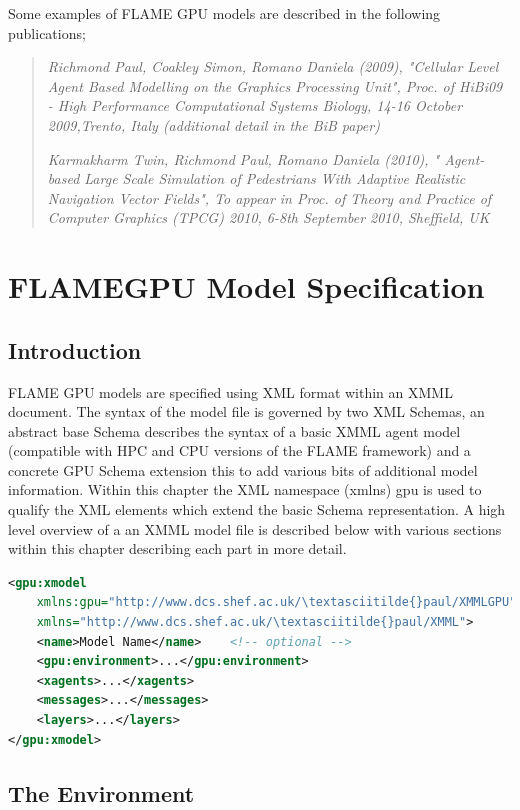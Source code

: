 \documentclass[11pt, a4paper, onecolumn, oneside]{report}
\begin{document}
Some examples of FLAME GPU models are described in the following publications;

\begin{quote}
\emph{Richmond Paul, Coakley Simon, Romano Daniela (2009), "Cellular Level Agent Based Modelling on the Graphics Processing Unit", Proc. of HiBi09 - High Performance Computational Systems Biology, 14-16 October 2009,Trento, Italy (additional detail in the BiB paper)}

\emph{Karmakharm Twin, Richmond Paul, Romano Daniela (2010), " Agent-based Large Scale Simulation of Pedestrians With Adaptive Realistic Navigation Vector Fields", To appear in Proc. of Theory and Practice of Computer Graphics (TPCG) 2010, 6-8th September 2010, Sheffield, UK}
\end{quote}


\chapter{FLAMEGPU Model Specification}
\label{ch:2}
\section{Introduction}
\label{sec:21}

FLAME GPU models are specified using XML format within an XMML document.
The syntax of the model file is governed by two XML Schemas, an abstract base Schema describes the syntax of a basic XMML agent model (compatible with HPC and CPU versions of the FLAME framework) and a concrete GPU Schema extension this to add various bits of additional model information.
Within this chapter the XML namespace (xmlns) gpu is used to qualify the XML elements which extend the basic Schema representation.
A high level overview of a an XMML model file is described below with various sections within this chapter describing each part in more detail.




\begin{lstlisting}[language=XML]
<gpu:xmodel
    xmlns:gpu="http://www.dcs.shef.ac.uk/\textasciitilde{}paul/XMMLGPU"
    xmlns="http://www.dcs.shef.ac.uk/\textasciitilde{}paul/XMML">
    <name>Model Name</name>    <!-- optional -->
    <gpu:environment>...</gpu:environment>
    <xagents>...</xagents>
    <messages>...</messages>
    <layers>...</layers>
</gpu:xmodel>
\end{lstlisting}

\section{The Environment}
\label{sec:22}
\end{document}
